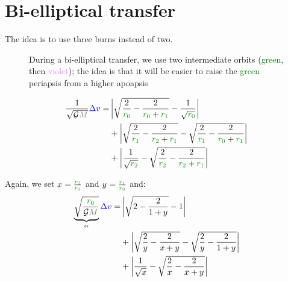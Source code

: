 \section{Bi-elliptical transfer}

The idea is to use three burns instead of two.

\begin{figure}[H]
\centering
{}
\caption{
	During a bi-elliptical transfer, we use two intermediate orbits
	(\textcolor{green}{green}, then \textcolor{violet}{violet});
	the idea is that it will be easier to raise the
	\textcolor{green}{green} periapsis from a higher apoapsis
}
\end{figure}

\begin{align*}
\frac 1 {\sqrt{\mathcal G \mass{M}}} \speed{\Delta v}
=&
\left|
\sqrt{
	\frac 2 {\dist{r_0}}
	-
	\frac 2 {\dist{r_0} + \dist{r_1}}
}
-
\frac 1 {\sqrt{\dist{r_0}}}
\right|
\\
&+
\left|
\sqrt{
	\frac 2 {\dist{r_1}}
	-
	\frac 2 {\dist{r_2} + \dist{r_1}}
}
-
\sqrt{
	\frac 2 {\dist{r_1}}
	-
	\frac 2 {\dist{r_0} + \dist{r_1}}
}
\right|
\\
&+
\left|
\frac 1 {\sqrt{\dist{r_2}}}
-
\sqrt{
	\frac 2 {\dist{r_2}}
	-
	\frac 2 {\dist{r_2} + \dist{r_1}}
}
\right|
\end{align*}

Again, we set $x = \frac {\dist{r_2}} {\dist{r_0}}$ and $y = \frac
{\dist{r_1}} {\dist{r_0}}$ and:
\begin{align*}
\underbrace{
	\sqrt{\frac {\dist{r_0}} {\mathcal G \mass{M}}}
}_{\alpha}
\speed{\Delta v}
=&
\left|
\sqrt{2 - \frac 2 {1 + y}}
-
1
\right|
\\
&+
\left|
\sqrt{\frac 2 y - \frac 2 {x + y}}
-
\sqrt{\frac 2 y - \frac 2 {1 + y}}
\right|
\\
&+
\left|
\frac 1 {\sqrt{x}}
-
\sqrt{\frac 2 x - \frac 2 {x + y}}
\right|
\end{align*}

